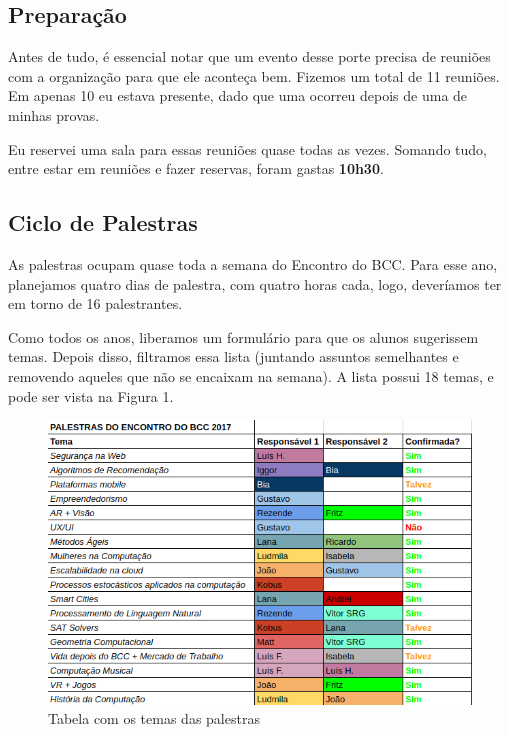\documentclass[12pt,letterpaper]{article}
\begin{document}
	\subsection{Preparação}
	
	Antes de tudo, é essencial notar que um evento desse porte precisa de reuniões com a organização para que ele aconteça bem. Fizemos um total de 11 reuniões. Em apenas 10 eu estava presente, dado que uma ocorreu depois de uma de minhas provas.
	
	Eu reservei uma sala para essas reuniões quase todas as vezes. Somando tudo, entre estar em reuniões e fazer reservas, foram gastas \textbf{10h30}.
	
	\subsection{Ciclo de Palestras}
	
	As palestras ocupam quase toda a semana do Encontro do BCC. Para esse ano, planejamos quatro dias de palestra, com quatro horas cada, logo, deveríamos ter em torno de 16 palestrantes.
	
	Como todos os anos, liberamos um formulário para que os alunos sugerissem temas. Depois disso, filtramos essa lista (juntando assuntos semelhantes e removendo aqueles que não se encaixam na semana). A lista possui 18 temas, e pode ser vista na Figura 1.
	
	\begin{figure}
		\begin{center}
			\includegraphics[scale=0.6]{palestras.png} 
			\caption{Tabela com os temas das palestras}
		\end{center}
	\end{figure}
\end{document}
